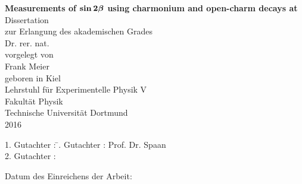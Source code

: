
\thispagestyle{empty}
\vspace*{4.0cm}

\begin{center}
\Huge\textbf{
  Measurements of $\boldsymbol{\sin 2\beta}$ using charmonium and open-charm decays at \lhcb
}
\vfill
\Large
Dissertation \\ zur Erlangung des akademischen Grades \\ Dr. rer. nat. \\
\vspace{20pt}
\normalsize
vorgelegt von \\[5pt]
{\Large Frank Meier} \\[5pt]
geboren in Kiel \\
\vspace{20pt}
Lehrstuhl f\"ur Experimentelle Physik V \\ Fakult\"at Physik \\
Technische Universit\"at Dortmund \\ 2016
\end{center}
\newpage



\thispagestyle{empty}
\vspace*{\fill}
\begin{tabbing}
1. Gutachter : \=. Gutachter : \>Prof. Dr. Spaan \\[11pt]
2. Gutachter :
\end{tabbing}
\vspace{11pt}
Datum des Einreichens der Arbeit:
\newpage
